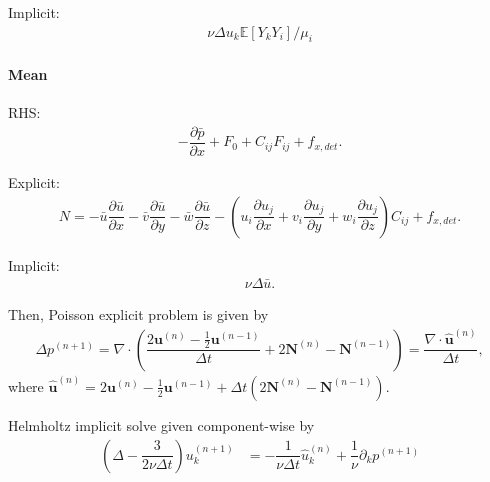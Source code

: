 \documentclass{article}
\begin{document}
	Implicit:\begin{align*}
		\nu\Delta u_k\mathbb{E}[Y_kY_i] / \mu_i
	\end{align*}
	
	\paragraph{Mean} RHS:\begin{align*}
		-\dfrac{\partial\bar p}{\partial x}+F_0+C_{ij}F_{ij}+f_{x,det}.
	\end{align*}
	
	Explicit:\begin{align*}
		N=-\bar u\dfrac{\partial\bar u}{\partial x}-\bar v\dfrac{\partial\bar u}{\partial y}-\bar w\dfrac{\partial\bar u}{\partial z}-\left(u_i\dfrac{\partial u_j}{\partial x}+v_i\dfrac{\partial u_j}{\partial y}+w_i\dfrac{\partial u_j}{\partial z}\right)C_{ij}+f_{x,det}.
	\end{align*}
	
	Implicit:\begin{align*}
		\nu\Delta\bar u.
	\end{align*}
	
	\newpage
	
	Then, Poisson explicit problem is given by
	\begin{align*}
		\Delta p^{(n+1)}=\nabla\cdot\left(\dfrac{2\mathbf{u}^{(n)}-\frac{1}{2}\mathbf{u}^{(n-1)}}{\Delta t}+2\mathbf{N}^{(n)}-\mathbf{N}^{(n-1)}\right)=\dfrac{\nabla\cdot\mathbf{\hat u}^{(n)}}{\Delta t},
	\end{align*}
	where $\mathbf{\hat u}^{(n)}=2\mathbf{u}^{(n)}-\frac{1}{2}\mathbf{u}^{(n-1)}+\Delta t(2\mathbf{N}^{(n)}-\mathbf{N}^{(n-1)})$.
	
	Helmholtz implicit solve given component-wise by\begin{align*}
		\left(\Delta-\dfrac{3}{2\nu\Delta t}\right)u_k^{(n+1)}&=-\dfrac{1}{\nu\Delta t}\hat u_k^{(n)}+\dfrac{1}{\nu}\partial_k p^{(n+1)}
	\end{align*}
	
\end{document}
